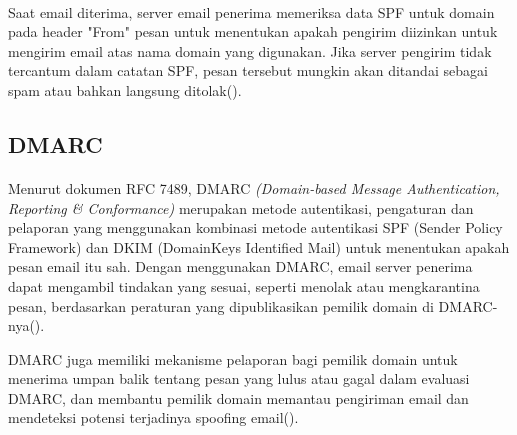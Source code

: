 \documentclass[./bab_2.tex]{subfiles}
\begin{document}
    \paragraph*{} Saat email diterima, server email penerima
    memeriksa data SPF untuk domain pada header "From" pesan
    untuk menentukan apakah pengirim diizinkan untuk
    mengirim email atas nama domain yang digunakan. Jika
    server pengirim tidak tercantum dalam catatan SPF, pesan
    tersebut mungkin akan ditandai sebagai spam atau bahkan
    langsung ditolak(\cite{rfc7208}).

    \subsection{DMARC}
    \paragraph*{} Menurut dokumen RFC 7489, DMARC
    \textit{(Domain-based Message Authentication, Reporting \&
    Conformance)} merupakan metode autentikasi, pengaturan
    dan pelaporan yang menggunakan
    kombinasi metode autentikasi SPF (Sender Policy
    Framework) dan DKIM (DomainKeys Identified Mail) untuk
    menentukan apakah pesan email itu sah. Dengan
    menggunakan DMARC, email server penerima dapat
    mengambil tindakan yang sesuai, seperti menolak atau
    mengkarantina pesan, berdasarkan peraturan yang
    dipublikasikan pemilik domain di
    DMARC-nya(\cite{rfc7489}).

    DMARC juga memiliki mekanisme pelaporan bagi pemilik
    domain untuk menerima umpan balik tentang pesan yang lulus
    atau gagal dalam evaluasi DMARC, dan membantu pemilik
    domain memantau pengiriman email dan mendeteksi potensi terjadinya
    spoofing email(\cite{rfc7489}).
\end{document}
